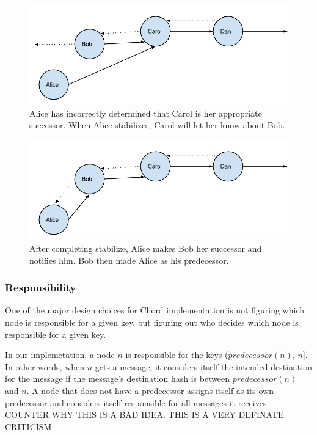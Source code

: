 \documentclass[conference, compsocconf, letterpaper]{IEEEtran}
\begin{document}
\begin{figure}
    \includegraphics[width=\linewidth]{abcd1}
    \caption{Alice has incorrectly determined that Carol is her appropriate successor.  When Alice stabilizes, Carol will let her know about Bob.}
    \label{abcd1}
\end{figure}


\begin{figure}
    \includegraphics[width=\linewidth]{abcd2}
    \caption{After completing stabilize, Alice makes Bob her successor and notifies him. Bob then made Alice as his predecessor.}
    \label{abcd2}
\end{figure}



\subsubsection{Responsibility}
One of the major design choices for Chord implementation is not figuring which node is responsible for a given key, but figuring out who decides which node is responsible for a given key.


In our implemetation, a node $n$ is responsible for the keys ($predecessor(n)$, $n$].  In other words, when $n$ gets a message, it considers itself the intended destination for the message if the message's destination hash is between $predecessor(n)$ and $n$.  A node that does not have a predecessor assigns itself as its own predecessor and considers itself responsible for all messages it receives.  COUNTER WHY THIS IS A BAD IDEA.  THIS IS A VERY DEFINATE CRITICISM 
\end{document}
